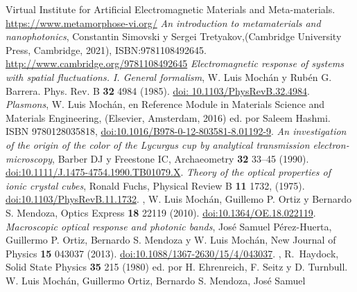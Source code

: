 \documentclass[12pt]{article}
\begin{document}
\begin{thebibliography}{0000}
 Virtual Institute for Artificial
  Electromagnetic Materials and
  Meta-materials. \url{https://www.metamorphose-vi.org/}
 {\em An introduction
  to metamaterials and nanophotonics}, Constantin Simovski y Sergei
Tretyakov,(Cambridge University Press, Cambridge, 2021), ISBN:9781108492645.
\url{http://www.cambridge.org/9781108492645}
  {\em Electromagnetic response of systems with spatial
  fluctuations. I. General formalism}, W. Luis Mochán y Rubén
  G. Barrera. Phys. Rev. B {\bf 32} 4984
  (1985). \href{https://journals.aps.org/prb/abstract/10.1103/PhysRevB.32.4984}{doi:
    10.1103/PhysRevB.32.4984}.
 {\em Plasmons}, W. Luis Mochán,
        en Reference Module in Materials Science and Materials
        Engineering, (Elsevier, Amsterdam, 2016)
        ed. por Saleem Hashmi.
        ISBN 9780128035818,
        \href{http://dx.doi.org/10.1016/B978-0-12-803581-8.01192-9}
        {doi:10.1016/B978-0-12-803581-8.01192-9}.
 {\em  An
  investigation of the origin of the color of the Lycurgus cup by
  analytical transmission electron-microscopy}, Barber DJ y Freestone
IC,  Archaeometry {\bf 32} 33–45 (1990).
\href{https://onlinelibrary.wiley.com/doi/10.1111/j.1475-4754.1990.tb01079.x}
{doi:10.1111/J.1475-4754.1990.TB01079.X}.
 {\em Theory of the optical properties of ionic crystal
  cubes}, Ronald Fuchs, Physical Review B {\bf 11} 1732, (1975).
  \href{http://link.aps.org/doi/10.1103/PhysRevB.11.1732}{doi:10.1103/PhysRevB.11.1732}.
,
 W. Luis Mochán, Guillemo P. Ortiz y Bernardo S. Mendoza,
 Optics Express {\bf 18} 22119 (2010).
 \href{https://www.osapublishing.org/oe/fulltext.cfm?uri=oe-18-21-22119&id=206120}
 {doi:10.1364/OE.18.022119}.
   {\em Macroscopic optical response and photonic
    bands}, José Samuel Pérez-Huerta, Guillermo P. Ortiz, Bernardo
  S. Mendoza y W. Luis Mochán, New Journal of Physics {\bf 15}
  043037 (2013).
  \href{https://iopscience.iop.org/article/10.1088/1367-2630/15/4/043037}
  {doi:10.1088/1367-2630/15/4/043037}.
,
R.~Haydock, Solid State Physics  {\bf 35} 215 (1980) ed. por
H. Ehrenreich, F. Seitz y D. Turnbull.
  W. Luis Mochán, Guillermo Ortiz, Bernardo S. Mendoza, José Samuel

\end{thebibliography}
\end{document}
